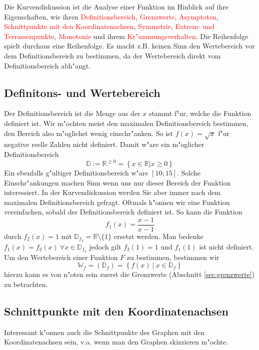 Die Kurvendiskussion ist die Analyse einer Funktion im Hinblick auf ihre Eigenschaften, wie ihren \textcolor{red}{Definitionsbereich}, \textcolor{red}{Grenzwerte}, \textcolor{red}{Asymptoten}, \textcolor{red}{Schnittpunkte mit den Koordinatenachsen}, \textcolor{red}{Symmetrie}, \textcolor{red}{Extrem- und Terrassenpunkte}, \textcolor{red}{Monotonie} und ihrem \textcolor{red}{Kr"ummungsverhalten}. Die Reihenfolge spielt durchaus eine Reihenfolge. Es macht z.B. keinen Sinn den Wertebereich vor dem Definitionsbereich zu bestimmen, da der Wertebereich direkt vom Definitionsbereich abh"angt.

\subsection{Definitons- und Wertebereich}
Der Definitionsbereich ist die Menge aus der $x$ stammt f"ur, welche die Funktion definiert ist. Wir m"ochten meist den maximalen Definitionsbereich bestimmen, den Bereich also m"oglichst wenig einschr"anken. So ist $f(x) = \sqrt{x}$ f"ur negative reelle Zahlen nicht definiert. Damit w"are ein m"oglicher Definitionsbereich 
\begin{equation*}
\mathbb{D} := \mathbb{R}^{\geq 0} = \left\{x \in \mathbb{R} | x \geq 0 \right\}
\end{equation*}
Ein ebenfalls g"ultiger Definitionsbereich w"are $\left[10;15\right]$. Solche Einschr"ankungen machen Sinn wenn uns nur dieser Bereich der Funktion interessiert. In der Kurvendiskussion werden Sie aber immer nach dem maximalen Definitionsbereich gefragt. Oftmals k"onnen wir eine Funktion vereinfachen, sobald der Definitionsbereich definiert ist. So kann die Funktion
\begin{equation*}
f_1(x) = \frac{x-1}{x-1}
\end{equation*}
durch $f_2(x) = 1$ mit $\mathbb{D}_{f_2} = \mathbb{R} \setminus \{1\}$ ersetzt werden. Man bedenke $f_1(x) = f_2(x) \ \forall x \in \mathbb{D}_{f_2}$ jedoch gilt $f_2(1) = 1$ und $f_1(1)$ ist nicht definiert. Um den Wertebereich einer Funktion $F$ zu bestimmen, bestimmen wir
\begin{equation*}
\mathbb{W}_f = (\mathbb{D}_f) = \left\{f(x) \ | \ x \in \mathbb{D}_f \right\}
\end{equation*}
hierzu kann es von n"oten sein zuerst die Grenzwerte (Abschnitt \ref{sec:grenzwerte}) zu betrachten.

\subsection{Schnittpunkte mit den Koordinatenachsen}
Interessant k"onnen auch die Schnittpunkte des Graphen mit den Koordinatenachsen sein, v.a. wenn man den Graphen skizzieren m"ochte.

